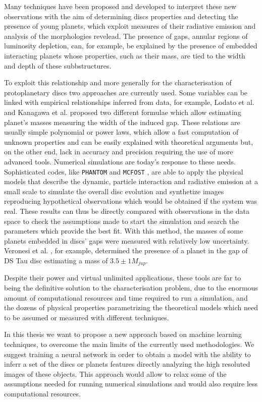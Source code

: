 \documentclass[a4paper,10pt]{report}
\begin{document}
Many techniques have been proposed and developed to interpret these new observations
with the aim of determining discs properties and detecting the presence of young planets,
which exploit measures of their radiative emission and analysis of the morphologies revelead.
The presence of gaps, annular regions of luminosity depletion, can, for example, be explained 
by the presence of embedded interacting planets whose properties, such as their mass, are
tied to the width and depth of these subbstructures.

To exploit this relationship and more generally for the characterisation of protoplanetary discs
two approaches are currently used. Some variables can be linked with empirical relationships 
inferred from data,
for example, Lodato et al. \cite{Lodato_2019} and Kanagawa et al. \cite{kanagawa} proposed 
two different formulae which allow estimating planet's masses measuring
the width of the induced gap. These relations are usually simple polynomial or power laws, which 
allow a fast computation of unknown properties and can be easily explained with theoretical
arguments but, on the other end,
lack in accuracy and precision requiring the use of more advanced tools.
Numerical simulations are today's response to these needs. Sophisticated codes,
 like \lstinline{PHANTOM} \cite{phantom} and \lstinline{MCFOST} \cite{mcfost1,mcfost2}, 
are able to apply the physical models that describe the dynamic, particle interaction and radiative emission at a small scale 
to simulate the overall disc evolution and synthetize images reproducing hypothetical observations which would be 
obtained if the system was real.
These results can thus be directly compared  with observations in the data 
space to check the assumptions made to start the simulation and 
search the parameters which provide the best fit. With this method, the masses of some planets embedded 
in discs' gaps were measured with relatively low uncertainty. Veronesi et al. \cite{dstauv}, for example, determined the
presence of a planet in the gap of DS Tau disc estimating a mass of $3.5 \pm 1 M_{jup}$.

Despite their power and virtual unlimited applications, these tools are far to being the definitive solution
to the characterisation problem, due to the enormous amount of computational resources and time 
required to run a simulation, and the dozens of physical properties parametrizing the theoretical models which need to be 
assumed or measured with different techniques.

In this thesis we want to propose a new approach based on machine learning techniques, to overcome 
the main limits of the currently used methodologies. We suggest training a neural network
in order to obtain a model with the ability to inferr a set of the discs or planets features directly
analyzing the high resoluted images of these objects. This approach would allow 
to relax some of the assumptions needed for running numerical simulations and would also require 
less computational resources.
\end{document}
